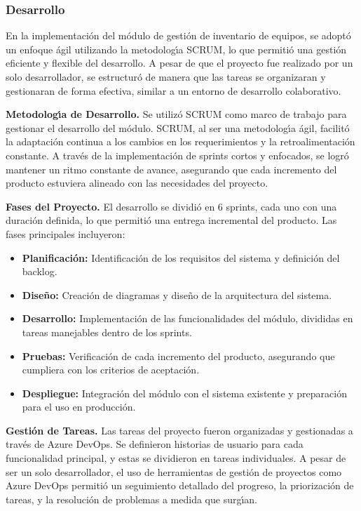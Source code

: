 \documentclass[stu, 12pt, letterpaper, donotrepeattitle, floatsintext, natbib]{apa7}
\begin{document}
\subsubsection{Desarrollo}
En la implementaci\'on del m\'odulo de gesti\'on de inventario de equipos, se adopt\'o un enfoque \'agil utilizando la metodolog\'{\i}a SCRUM, lo que permiti\'o una gesti\'on eficiente y flexible del desarrollo. A pesar de que el proyecto fue realizado por un solo desarrollador, se estructur\'o de manera que las tareas se organizaran y gestionaran de forma efectiva, similar a un entorno de desarrollo colaborativo.

\textbf{Metodolog\'{\i}a de Desarrollo. }Se utiliz\'o SCRUM como marco de trabajo para gestionar el desarrollo del m\'odulo. SCRUM, al ser una metodolog\'{\i}a \'agil, facilit\'o la adaptaci\'on continua a los cambios en los requerimientos y la retroalimentaci\'on constante. A trav\'es de la implementaci\'on de sprints cortos y enfocados, se logr\'o mantener un ritmo constante de avance, asegurando que cada incremento del producto estuviera alineado con las necesidades del proyecto.

\textbf{Fases del Proyecto. }El desarrollo se dividi\'o en 6 sprints, cada uno con una duraci\'on definida, lo que permiti\'o una entrega incremental del producto. Las fases principales incluyeron:
\begin{itemize}
    \item\textbf{Planificaci\'on: }Identificaci\'on de los requisitos del sistema y definici\'on del backlog.
    \item\textbf{Dise\~{n}o: }Creaci\'on de diagramas y dise\~{n}o de la arquitectura del sistema.
    \item\textbf{Desarrollo: }Implementaci\'on de las funcionalidades del m\'odulo, divididas en tareas manejables dentro de los sprints.
    \item\textbf{Pruebas: }Verificaci\'on de cada incremento del producto, asegurando que cumpliera con los criterios de aceptaci\'on.
    \item\textbf{Despliegue: }Integraci\'on del m\'odulo con el sistema existente y preparaci\'on para el uso en producci\'on.
\end{itemize}

\textbf{Gesti\'on de Tareas. }Las tareas del proyecto fueron organizadas y gestionadas a trav\'es de Azure DevOps. Se definieron historias de usuario para cada funcionalidad principal, y estas se dividieron en tareas individuales. A pesar de ser un solo desarrollador, el uso de herramientas de gesti\'on de proyectos como Azure DevOps permiti\'o un seguimiento detallado del progreso, la priorizaci\'on de tareas, y la resoluci\'on de problemas a medida que surg\'{\i}an.
\end{document}
